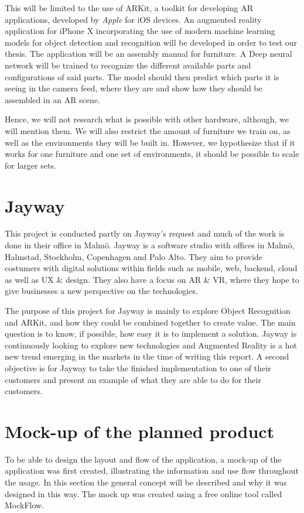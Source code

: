 This will be limited to the use of ARKit, a toolkit for developing AR applications, developed by \textit{Apple} for iOS devices. An augmented reality application for iPhone X incorporating the use of modern machine learning models for object detection and recognition will be developed in order to test our thesis. The application will be an assembly manual for furniture. A Deep neural network will be trained to recognize the different available parts and configurations of said parts.  The model should then predict which parts it is seeing in the camera feed, where they are and show how they should be assembled in an AR scene. 

Hence, we will not research what is possible with other hardware, although, we will mention them. We will also restrict the amount of furniture we train on, as well as the environments they will be built in. However, we hypothesize that if it works for one furniture and one set of environments, it should be possible to scale for larger sets.


\section{Jayway}
\label{subSecJayway}
This project is conducted partly on Jayway's request and much of the work is done in their office in Malmö.
Jayway is a software studio with offices in Malmö, Halmstad, Stockholm, Copenhagen and Palo Alto. They aim to provide costumers with digital solutions  within fields such as mobile, web, backend, cloud as well as UX \& design. They also have a focus on AR \& VR, where they hope to give businesses a new perspective on the technologies.


The purpose of this project for Jayway is mainly to explore Object Recognition  and ARKit, and how they could be combined together to create value. The main question is to know, if possible, how easy it is to implement a solution.
Jayway is continuously looking to explore new technologies and Augmented Reality is a hot new trend emerging in the markets in the time of writing this report.
A second objective is for Jayway to take the finished implementation to one of their customers and
present an example of what they are able to do for their customers.

\section{Mock-up of the planned product}
\label{subSecMockup}
To be able to design the layout and flow of the application, a mock-up of the application was first created, illustrating the information and use flow throughout the usage. In this section the general concept will be described and why it was designed in this way. The mock up was created using a free online tool called MockFlow\cite{mockflow}. 

